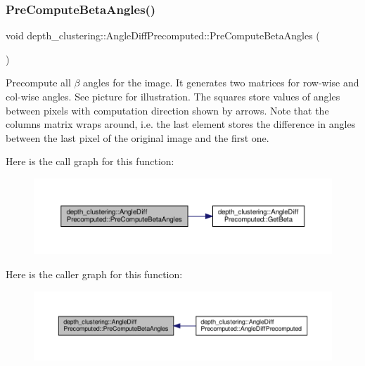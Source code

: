 \subsubsection{\texorpdfstring{Pre\+Compute\+Beta\+Angles()}{PreComputeBetaAngles()}}
{\footnotesize\ttfamily void depth\+\_\+clustering\+::\+Angle\+Diff\+Precomputed\+::\+Pre\+Compute\+Beta\+Angles (\begin{DoxyParamCaption}{ }\end{DoxyParamCaption})\hspace{0.3cm}{\ttfamily [protected]}}



Precompute all $\beta$ angles for the image. It generates two matrices for row-\/wise and col-\/wise angles. See picture for illustration. The squares store values of angles between pixels with computation direction shown by arrows. Note that the columns matrix wraps around, i.\+e. the last element stores the difference in angles between the last pixel of the original image and the first one. 

 Here is the call graph for this function\+:\nopagebreak
\begin{figure}[H]
\begin{center}
\leavevmode
\includegraphics[width=350pt]{classdepth__clustering_1_1AngleDiffPrecomputed_aeb86ee61c6e8fc1b5b554368b1f5fa27_cgraph}
\end{center}
\end{figure}
Here is the caller graph for this function\+:\nopagebreak
\begin{figure}[H]
\begin{center}
\leavevmode
\includegraphics[width=350pt]{classdepth__clustering_1_1AngleDiffPrecomputed_aeb86ee61c6e8fc1b5b554368b1f5fa27_icgraph}
\end{center}
\end{figure}
\mbox{\label{classdepth__clustering_1_1AngleDiffPrecomputed_a2fd85404d06843af0ee5c713017f6641}} 
